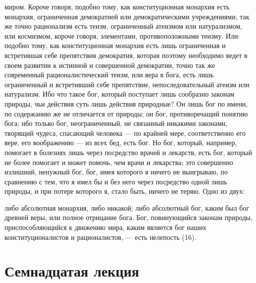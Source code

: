 \documentclass[12pt]{article}
\begin{document}
миром. Короче говоря, подобно тому, как конституционная монархия есть монархия, ограниченная демократией или демократическими учреждениями, так же точно рационализм есть теизм, ограниченный атеизмом или натурализмом, или космизмом, короче говоря, элементами, противоположными теизму. Или: подобно тому, как конституционная монархия есть лишь ограниченная и встретившая себе препятствия демократия, которая поэтому необходимо ведет в своем развитии к истинной и совершенной демократии, точно так же современный рационалистический теизм, или вера в бога, есть лишь ограниченный и встретивший себе препятствие, непоследовательный атеизм или натурализм. Ибо что такое бог, который поступает лишь сообразно законам природы, чьи действия суть лишь действия природные? Он лишь бог по имени, по содержанию же не отличается от природы; он бог, противоречащий понятию бога; ибо только бог, неограниченный, не связанный никакими законами, творящий чудеса, спасающий человека --- по крайней мере, соответственно его вере, его воображению --- из всех бед, есть бог. Но бог, который, например, помогает в болезнях лишь через посредство врачей и лекарств, есть бог, который не более помогает и может помочь, чем врачи и лекарства; это совершенно излишний, ненужный бог, бог, имея которого я ничего не выигрываю, по сравнению с тем, что я имел бы и без него через посредство одной лишь природы, и при потере которого я, стало быть, ничего не теряю. Одно из двух: 

либо абсолютная монархия, либо никакой; либо абсолютный бог, каким был бог древней веры, или полное отрицание бога. Бог, повинующийся законам природы, приспособляющийся к движению мира, каким является бог наших конституционалистов и рационалистов, --- есть нелепость (16). 

\section*{Семнадцатая лекция}
\end{document}
